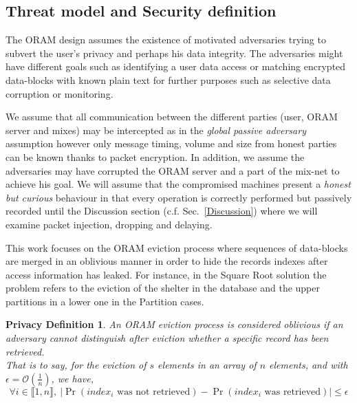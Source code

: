 \documentclass{llncs}
\newtheorem{privdef}{Privacy Definition}
\begin{document}
\subsection{Threat model and Security definition}\label{Threat}

The ORAM design assumes the existence of motivated adversaries trying to subvert the user's privacy and perhaps his data integrity.
The adversaries might have different goals such as identifying a user data access or matching encrypted data-blocks with known plain text for further purposes such as selective data corruption or monitoring.

We assume that all communication between the different parties (user, ORAM server and mixes) may be intercepted as in the \textit{global passive adversary} assumption however only message timing, volume and size from honest parties can be known thanks to packet encryption.
In addition, we assume the adversaries may have corrupted the ORAM server and a part of the mix-net to achieve his goal.
We will assume that the compromised machines present a \textit{honest but curious} behaviour in that every operation is correctly performed but passively recorded until the Discussion section (c.f. Sec.~\ref{Discussion}) where we will examine packet injection, dropping and delaying.

This work focuses on the ORAM eviction process where sequences of data-blocks are merged in an oblivious manner in order to hide the records indexes after access information has leaked. For instance, in the Square Root solution the problem refers to the eviction of the shelter in the database and the upper partitions in a lower one in the Partition cases.

\iffalse
\begin{privdef}{Eviction Old Security.}
An ORAM eviction process is considered secure if an adversary cannot distinguish after eviction the location of any specific record. 
\end{privdef}
\fi

\begin{privdef}
An ORAM eviction process is considered oblivious if an adversary cannot distinguish after eviction whether a specific record has been retrieved.\\
That is to say, for the eviction of $s$ elements in an array of $n$ elements, and with $\epsilon =\mathcal{O}\left ( \frac{1}{n} \right )$, we have,
$$ \forall i \in \llbracket 1, n \rrbracket,\ |\Pr(index_i \text{ was not retrieved} ) - \Pr(index_i \text{ was retrieved} )| \leq \epsilon$$
\end{privdef}
%
\end{document}
